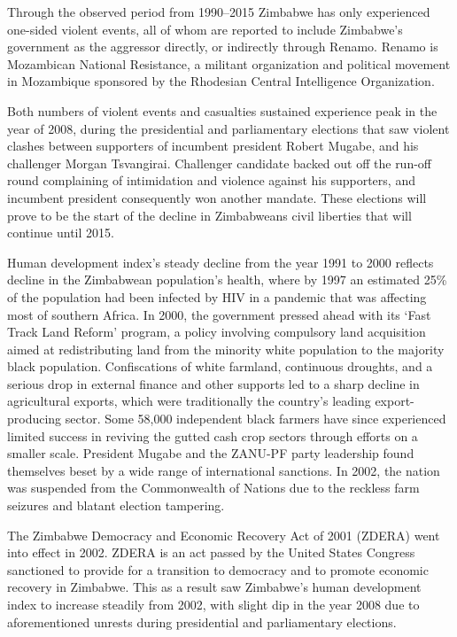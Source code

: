 \documentclass[a4paper,11pt]{article}
\begin{document}
Through the observed period from 1990--2015 Zimbabwe has only experienced one-sided violent events, all of whom are reported to include Zimbabwe’s government as the aggressor directly, or indirectly through Renamo. Renamo is Mozambican National Resistance, a militant organization and political movement in Mozambique sponsored by the Rhodesian Central Intelligence Organization.

Both numbers of violent events and casualties sustained experience peak in the year of 2008, during the presidential and parliamentary elections that saw violent clashes between supporters of incumbent president Robert Mugabe, and his challenger Morgan Tsvangirai. Challenger candidate backed out off the run-off round complaining of intimidation and violence against his supporters, and incumbent president consequently won another mandate. These elections will prove to be the start of the decline in Zimbabweans civil liberties that will continue until 2015.

Human development index’s steady decline from the year 1991 to 2000 reflects decline in the Zimbabwean population’s health, where by 1997 an estimated 25\% of the population had been infected by HIV in a pandemic that was affecting most of southern Africa. In 2000, the government pressed ahead with its ‘Fast Track Land Reform’ program, a policy involving compulsory land acquisition aimed at redistributing land from the minority white population to the majority black population. Confiscations of white farmland, continuous droughts, and a serious drop in external finance and other supports led to a sharp decline in agricultural exports, which were traditionally the country's leading export-producing sector. Some 58,000 independent black farmers have since experienced limited success in reviving the gutted cash crop sectors through efforts on a smaller scale. President Mugabe and the ZANU-PF party leadership found themselves beset by a wide range of international sanctions. In 2002, the nation was suspended from the Commonwealth of Nations due to the reckless farm seizures and blatant election tampering.

The Zimbabwe Democracy and Economic Recovery Act of 2001 (ZDERA) went into effect in 2002. ZDERA is an act passed by the United States Congress sanctioned to provide for a transition to democracy and to promote economic recovery in Zimbabwe. This as a result saw Zimbabwe’s human development index to increase steadily from 2002, with slight dip in the year 2008 due to aforementioned unrests during presidential and parliamentary elections.
\end{document}
